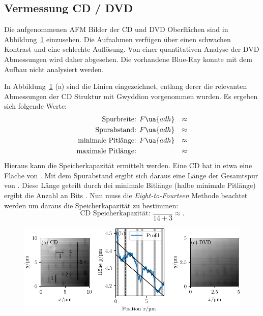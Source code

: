 \subsection{Vermessung CD / DVD}
Die aufgenommenen AFM Bilder der CD und DVD Oberflächen sind in Abbildung~\ref{fig: cd} einzusehen.
Die Aufnahmen verfügen über einen schwachen Kontrast und eine schlechte Auflösung. Von einer
quantitativen Analyse der DVD Abmessungen wird daher abgesehen. Die vorhandene Blue-Ray
konnte mit dem Aufbau nicht analysiert werden.

In Abbildung~\ref{fig: cd} (a) sind die Linien eingezeichnet, entlang derer die relevanten Abmessungen der
CD Struktur mit Gwyddion vorgenommen wurden. Es ergeben sich folgende Werte:
\begin{align}
  \begin{aligned}
    \text{Spurbreite: } & F\ua{adh} &\approx \\
    \text{Spurabstand: } & F\ua{adh}       &\approx \\
    \text{minimale Pitlänge: } & F\ua{adh}    &\approx \\
    \text{maximale Pitlänge: } & &\approx
  \end{aligned}
\end{align}
Hieraus kann die Speicherkapazität ermittelt werden. Eine CD hat in etwa eine Fläche von . Mit dem Spurabstand ergibt sich daraus
eine Länge der Gesamtspur von . Diese Länge geteilt durch dei minimale Bitlänge (halbe minimale Pitlänge) ergibt die Anzahl an Bits .
Nun muss die \textit{Eight-to-Fourteen}
Methode beachtet werden um daraus die Speicherkapazität zu bestimmen:
\begin{equation}
  \text{CD Speicherkapazität: } \frac{}{14 + 3} \approx.
\end{equation}


\begin{figure}
  \centering
  \includegraphics[scale = 1]{../analysis/data/cd/cd_profil.pdf}
  \caption{}
  \label{fig: cd}
\end{figure}


